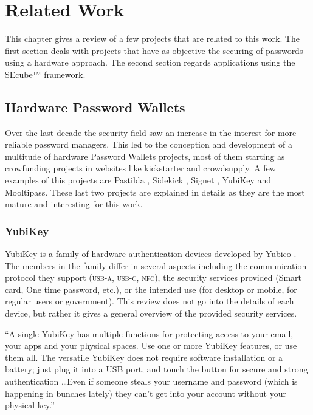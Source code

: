 \chapter{Related Work} \label{chap:related}

This chapter gives a review of a few projects that are related to this work. The first section deals with projects that have as objective the securing of passwords using a hardware approach. The second section regards applications using the SEcube™ framework.

\section {Hardware Password Wallets}
Over the last decade the security field saw an increase in the interest for more reliable password managers. This led to the conception and development of a multitude of hardware Password Wallets projects, most of them starting as crowfunding projects in websites like kickstarter and crowdsupply. A few examples of this projects are Pastilda \cite{pasti}, Sidekick \cite{side}, Signet \cite{signet},  YubiKey and Mooltipass. These last two projects are explained in details as they are the most mature and interesting for this work.


\subsection{YubiKey}

YubiKey is a family of hardware authentication devices developed by Yubico \cite{yubi}. The members in the family differ in several aspects including the communication protocol they support (\textsc{usb-a}, \textsc{usb-c}, \textsc{nfc}), the security services provided (Smart card, One time password, etc.), or the intended use (for desktop or mobile, for regular users or government). This review does not go into the details of each device, but rather it gives a general overview of the provided security services. 

``A single YubiKey has multiple functions for protecting access to your email, your apps and your physical spaces. Use one or more YubiKey features, or use them all. The versatile YubiKey does not require software installation or a battery; just plug it into a USB port, and touch the button for secure and strong authentication \ldots  Even if someone steals your username and password (which is happening in bunches lately) they can’t get into your account without your physical key.''\cite{yubiworks}

